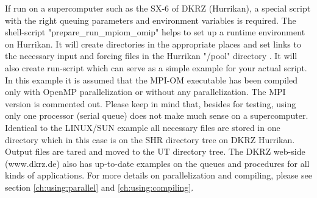 If run on a supercomputer such as the SX-6 of DKRZ (Hurrikan), a special script with the right queuing parameters 
and environment variables is required.
The shell-script "prepare\_run\_mpiom\_omip" helps to set up
a runtime environment on Hurrikan. It will create directories in the appropriate places and 
set links to the necessary input and forcing files in the Hurrikan "/pool" directory . 
It will also create run-script 
which can serve as a simple example for your actual script.
In this example it is assumed that the MPI-OM executable has been compiled only with OpenMP parallelization
or without any parallelization. The MPI version is commented out.
Please keep in mind that, besides for testing, using only one processor (serial queue) 
does not make much sense on a supercomputer. 
Identical to the LINUX/SUN example all necessary  files are stored
in one directory which in this case is on the SHR directory tree on DKRZ Hurrikan. 
Output files are tared and moved to the UT directory tree. 
The DKRZ web-side (www.dkrz.de) also has up-to-date examples on the queues and procedures for all kinds of applications.
For more details on parallelization and compiling, please see section \ref{ch:using:parallel} and \ref{ch:using:compiling}.


